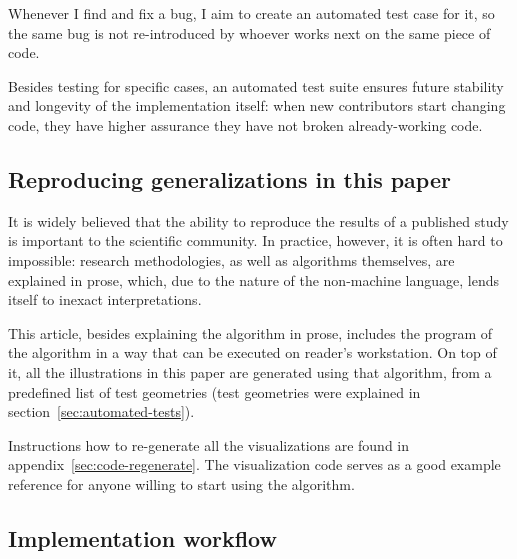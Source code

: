 \documentclass[a4paper]{article}
\begin{document}
Whenever I find and fix a bug, I aim to create an automated test case for it,
so the same bug is not re-introduced by whoever works next on the same piece of
code.

Besides testing for specific cases, an automated test suite ensures future
stability and longevity of the implementation itself: when new contributors
start changing code, they have higher assurance they have not broken
already-working code.

\subsection{Reproducing generalizations in this paper}
\label{sec:reproducing-the-paper}

It is widely believed that the ability to reproduce the results of a published
study is important to the scientific community. In practice, however, it is
often hard to impossible: research methodologies, as well as algorithms
themselves, are explained in prose, which, due to the nature of the non-machine
language, lends itself to inexact interpretations.

This article, besides explaining the algorithm in prose, includes the program
of the algorithm in a way that can be executed on reader's workstation. On top
of it, all the illustrations in this paper are generated using that algorithm,
from a predefined list of test geometries (test geometries were explained in
section~\ref{sec:automated-tests}).

Instructions how to re-generate all the visualizations are found in
appendix~\ref{sec:code-regenerate}. The visualization code serves as a good
example reference for anyone willing to start using the algorithm.

\subsection{Implementation workflow}

\end{document}
